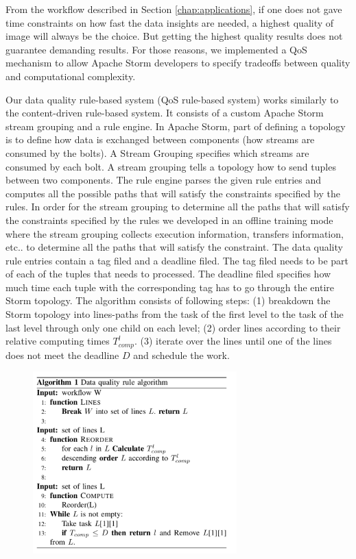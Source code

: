 From the workflow described in Section \ref{chap:applications}, if one does not gave time constraints on how fast the data insights are needed, a highest quality of   image will always be the choice. But getting the highest quality results does not guarantee demanding results. For those reasons, we implemented a QoS mechanism to allow Apache Storm developers to specify tradeoffs between quality and computational complexity.

Our data quality rule-based system (QoS rule-based system) works similarly to the content-driven rule-based system. It consists of a custom Apache Storm stream grouping and a rule engine. In Apache Storm, part of defining a topology is to define how data is exchanged between components (how streams are consumed by the bolts). A Stream Grouping specifies which streams are consumed by each bolt. A stream grouping tells a topology how to send tuples between two components. The rule engine parses the given rule entries and computes all the possible paths that will satisfy the constraints specified by the rules. In order for the stream grouping to determine all the paths that will satisfy the constraints specified by the rules we developed in an offline training mode where the stream grouping collects execution information, transfers information, etc.. to determine all the paths that will satisfy the constraint. The data quality rule entries contain a tag filed and a deadline filed. The tag filed needs to be part of each of the tuples that needs to processed. The deadline filed specifies how much time each tuple with the corresponding tag has to go through the entire Storm topology. The algorithm consists of following steps: (1) breakdown the Storm topology into lines-paths from the task of the first level to the task of the last level through only one child on each level; (2) order lines according to their relative computing times $T_{comp}^l$. (3) iterate over the lines until one of the lines does not meet the deadline $D$ and schedule the work.

\begin{figure}[h!]
  \centering
  \includegraphics[width=0.7\textwidth]{Figures/Algorithm.pdf}
  \label{fig:Algorithm}
\end{figure}

